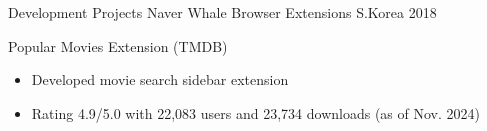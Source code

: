 \begin{cventries}
\cventry
  {Development Projects} %
  {Naver Whale Browser Extensions} %
  {S.Korea} %
  {2018} %
  {
    \begin{cvitems}
      \item {Popular Movies Extension (TMDB)}
      \begin{itemize}
        \item {Developed movie search sidebar extension}
        \item {Rating 4.9/5.0 with 22,083 users and 23,734 downloads (as of Nov. 2024)}
      \end{itemize}
    \end{cvitems}
  }

\end{cventries}